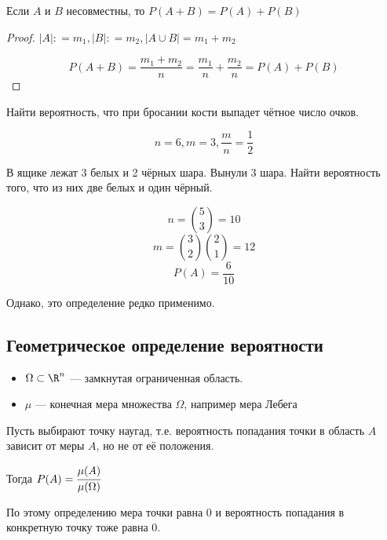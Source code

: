 \documentclass[12pt, a4paper, oneside]{book}
\begin{document}
Если \(A\) и \(B\) несовместны, то \(P(A + B) = P(A) + P(B)\)

\begin{proof}
    \(|A| : = m_1, |B| : = m_2, |A\cup B|= m_1 + m_2\)

    \[P(A + B) = \frac{m_1 + m_2}{n} = \frac{m_1}{n} + \frac{m_2}{n} = P(A) + P(B)\]
\end{proof}

\begin{example}
    Найти вероятность, что при бросании кости выпадет чётное число очков.

    \[n = 6, m = 3, \frac{m}{n} = \frac{1}{2}\]
\end{example}

\begin{example}
    В ящике лежат 3 белых и 2 чёрных шара. Вынули 3 шара. Найти вероятность того, что из них две белых и один чёрный.

    \[n = \binom{5}{3} = 10\]
    \[m = \binom{3}{2} \binom{2}{1} = 12\]
    \[P(A) = \frac{6}{10}\]
\end{example}

Однако, это определение редко применимо.

\subsection{Геометрическое определение вероятности}

\begin{definition}\itemfix
    \begin{itemize}
        \item \(\Omega \subset \R^n\) --- замкнутая ограниченная область.
        \item \(\mu\) --- конечная мера множества \(\Omega\), например мера Лебега
    \end{itemize}

    Пусть выбирают точку наугад, т.е. вероятность попадания точки в область \(A\) зависит от меры \(A\), но не от её положения.

    Тогда
    \(P(A) = \cfrac{\mu(A)}{\mu(\Omega)}\)
\end{definition}

\begin{remark}
    По этому определению мера точки равна \(0\) и вероятность попадания в конкретную точку тоже равна \(0\).
\end{remark}
\end{document}
